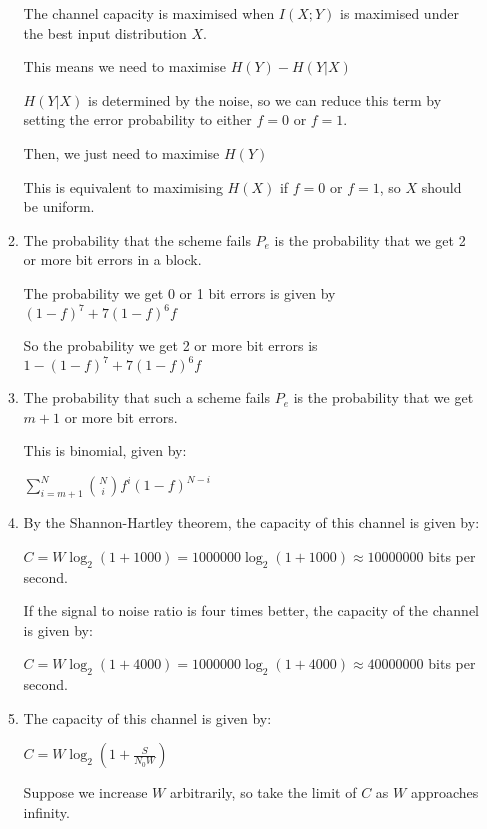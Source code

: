 \begin{enumerate}
\begin{enumerate}
                    The channel capacity is maximised when $I(X;Y)$ is maximised under the best input distribution $X$.

                    This means we need to maximise $H(Y) - H(Y|X)$

                    $H(Y|X)$ is determined by the noise, so we can reduce this term by setting the error probability to either $f=0$ or $f=1$.

                    Then, we just need to maximise $H(Y)$

                    This is equivalent to maximising $H(X)$ if $f=0$ or $f=1$, so $X$ should be uniform.

                    \item
                      The probability that the scheme fails $P_e$ is the probability that we get 2 or more bit errors in a block.

                      The probability we get 0 or 1 bit errors is given by $(1-f)^7 + 7(1-f)^6f$

                      So the probability we get 2 or more bit errors is $1 - (1-f)^7+ 7(1-f)^6f$

                      \item
                        The probability that such a scheme fails $P_e$ is the probability that we get $m+1$ or more bit errors.

                        This is binomial, given by:

                        $\sum_{i=m+1}^N \binom{N}{i} f^i(1-f)^{N-i}$

                        \item

                          By the Shannon-Hartley theorem, the capacity of this channel is given by:

                          $C = W\log_2(1 + 1000) = 1000000\log_2(1 + 1000) \approx 10000000$ bits per second.

                          If the signal to noise ratio is four times better, the capacity of the channel is given by:

                          $C = W\log_2(1 + 4000) = 1000000\log_2(1 + 4000) \approx 40000000$ bits per second.

\item
  The capacity of this channel is given by:

  $C = W\log_2(1 + \frac{S}{N_0W})$

  Suppose we increase $W$ arbitrarily, so take the limit of $C$ as $W$ approaches infinity.


\end{enumerate}
\end{enumerate}
